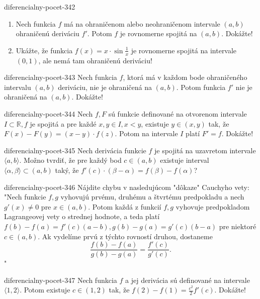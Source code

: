 \begin{defproblem}{diferencialny-pocet-342}
\begin{enumerate}
\item Nech funkcia $f$ má na ohraničenom alebo neohraničenom intervale $(a,b)$ ohraničenú deriváciu $f'$. Potom $f$ je rovnomerne spojitá na $(a,b)$. Dokážte!
\item Ukážte, že funkcia $f(x)=x\cdot \sin \frac{1}{x}$ je rovnomerne spojitá na intervale $(0,1)$, ale nemá tam ohraničenú deriváciu!
\end{enumerate}
\end{defproblem}

\begin{defproblem}{diferencialny-pocet-343}
Nech funkcia $f$, ktorá má v každom bode ohraničeného intervalu $(a,b)$ deriváciu, nie je ohraničená na $(a,b)$. Potom funkcia $f'$ nie je ohraničená na $(a,b)$. Dokážte!
\end{defproblem}

\begin{defproblem}{diferencialny-pocet-344}
Nech $f,F$ sú funkcie definované na otvorenom intervale $I \subset \mathbb{R},f$ je spojitá a pre každé $x,y\in I,x<y$, existuje $y\in (x,y)$ tak, že $F(x)-F(y)=(x-y)\cdot f(z)$. Potom na intervale $I$ platí $F'=f$. Dokážte!
\end{defproblem}

\begin{defproblem}{diferencialny-pocet-345}
Nech derivácia funkcie $f$ je spojitá na uzavretom intervale $\langle a,b \rangle$. Možno tvrdiť, že pre každý bod $c\in (a,b)$ existuje interval $\langle \alpha,\beta \rangle \subset (a,b)$ taký, že $f'(c)\cdot (\beta-\alpha)=f(\beta)-f(\alpha)$?
\end{defproblem}

\begin{defproblem}{diferencialny-pocet-346}
Nájdite chybu v nasledujúcom "dôkaze" Cauchyho vety: "Nech funkcie $f,g$ vyhovujú prvému, druhému a štvrtému predpokladu a nech $g'(x)\neq 0$ pre $x\in (a,b)$. Potom každá z funkcií $f,g$ vyhovuje predpokladom Lagrangeovej vety o strednej hodnote, a teda platí $f(b)-f(a)=f'(c)(a-b),g(b)-g(a)=g'(c)(b-a)$ pre niektoré $c\in (a,b)$. Ak vydelíme prvú z týchto rovností druhou, dostaneme
$$\frac{f(b)-f(a)}{g(b)-g(a)}=\frac{f'(c)}{g'(c)}.$$"
\end{defproblem}

\begin{defproblem}{diferencialny-pocet-347}
Nech funkcia $f$ a jej derivácia sú definované na intervale $\langle 1,2 \rangle$. Potom existuje $c\in (1,2)$ tak, že $f(2)-f(1)=\frac{c^2}{2}f'(c)$. Dokážte!
\end{defproblem}

